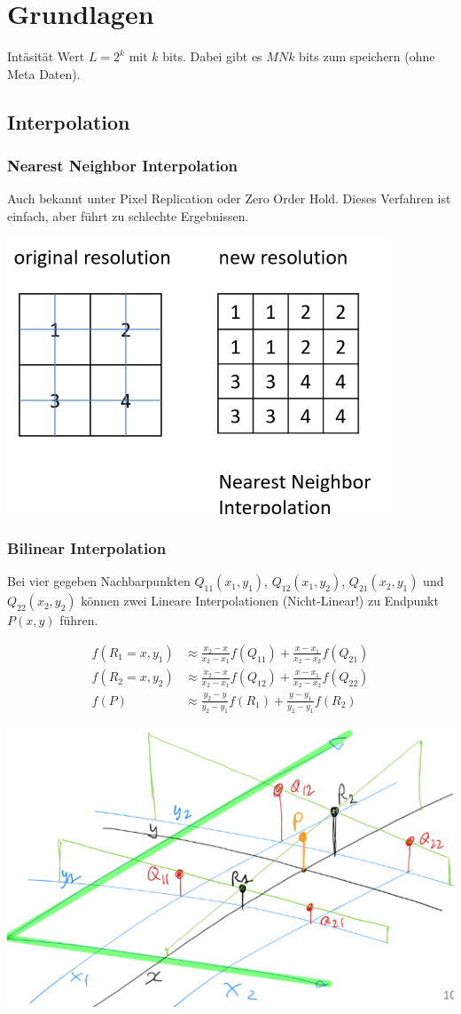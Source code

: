 \section{Grundlagen}
Intäsität Wert $L = 2^k$ mit $k$ bits. Dabei gibt es $MNk$ bits zum speichern (ohne Meta Daten).

\subsection{Interpolation}
\subsubsection{Nearest Neighbor Interpolation}
Auch bekannt unter Pixel Replication oder Zero Order Hold. Dieses Verfahren ist einfach, aber führt zu schlechte Ergebnissen.
\begin{center}
	\includegraphics[width=0.4\columnwidth]{Images/nni}
\end{center}

\subsubsection{Bilinear Interpolation}
Bei vier gegeben Nachbarpunkten $Q_{11}(x_1, y_1)$, $Q_{12}(x_1, y_2)$, $Q_{21}(x_2, y_1)$ und $Q_{22}(x_2, y_2)$ können zwei Lineare Interpolationen (Nicht-Linear!) zu Endpunkt $P(x, y)$ führen.

\begin{align*}
	f(R_1=x,y_1) &\approx \frac{x_2-x}{x_2-x_1}f(Q_{11}) + \frac{x-x_1}{x_2-x_2}f(Q_{21}) \\
	f(R_2=x,y_2) &\approx \frac{x_2-x}{x_2-x_1}f(Q_{12}) + \frac{x-x_1}{x_2-x_2}f(Q_{22}) \\
	f(P) &\approx \frac{y_2-y}{y_2-y_1}f(R_1) + \frac{y-y_1}{y_2-y_1}f(R_2)
\end{align*}

\begin{center}
	\includegraphics[width=0.7\columnwidth]{Images/bi}
\end{center}


